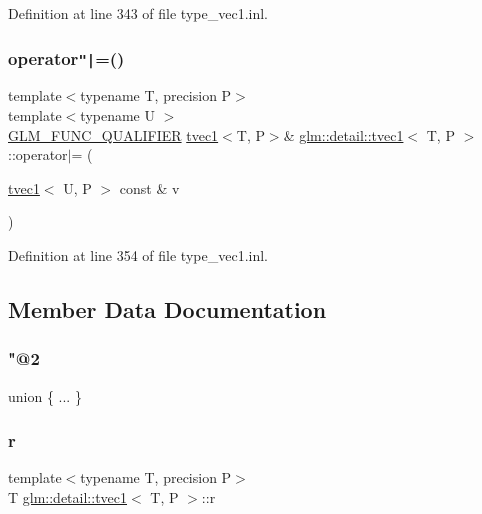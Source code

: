 Definition at line 343 of file type\+\_\+vec1.\+inl.

\mbox{\label{structglm_1_1detail_1_1tvec1_ad91d6098835a4019b008360a48bde0ff}} 
\subsubsection{\texorpdfstring{operator\texttt{"|}=()}{operator|=()}\hspace{0.1cm}{\footnotesize\ttfamily [4/4]}}
{\footnotesize\ttfamily template$<$typename T, precision P$>$ \\
template$<$typename U $>$ \\
\hyperlink{setup_8hpp_a33fdea6f91c5f834105f7415e2a64407}{G\+L\+M\+\_\+\+F\+U\+N\+C\+\_\+\+Q\+U\+A\+L\+I\+F\+I\+ER} \hyperlink{structglm_1_1detail_1_1tvec1}{tvec1}$<$T, P$>$\& \hyperlink{structglm_1_1detail_1_1tvec1}{glm\+::detail\+::tvec1}$<$ T, P $>$\+::operator$\vert$= (\begin{DoxyParamCaption}\item[{\hyperlink{structglm_1_1detail_1_1tvec1}{tvec1}$<$ U, P $>$ const \&}]{v }\end{DoxyParamCaption})}



Definition at line 354 of file type\+\_\+vec1.\+inl.



\subsection{Member Data Documentation}
\mbox{\label{structglm_1_1detail_1_1tvec1_a3aa522dbf529fb3cbafd2471379f6854}} 
\subsubsection{\texorpdfstring{"@2}{@2}}
{\footnotesize\ttfamily union \{ ... \} }

\mbox{\label{structglm_1_1detail_1_1tvec1_a23dd665bc4be83544c436a88fdcea088}} 
\subsubsection{\texorpdfstring{r}{r}}
{\footnotesize\ttfamily template$<$typename T, precision P$>$ \\
T \hyperlink{structglm_1_1detail_1_1tvec1}{glm\+::detail\+::tvec1}$<$ T, P $>$\+::r}



